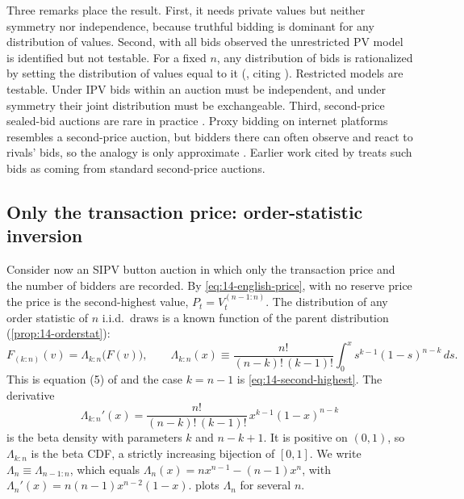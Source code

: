 Three remarks place the result. First, it needs private values but neither symmetry nor independence, because
truthful bidding is dominant for any distribution of values. Second, with all bids observed the unrestricted PV
model is identified but not testable. For a fixed $n$, any distribution of bids is rationalized by setting the
distribution of values equal to it (\citealp[p.~2118]{AtheyHaile2002}, citing \citealp{LaffontVuong1996}).
Restricted models are
testable. Under IPV bids within an auction must be independent, and under symmetry their joint distribution must be
exchangeable. Third, second-price sealed-bid auctions are rare in practice \citep[footnote~2]{AtheyHaile2007}. Proxy
bidding on internet platforms resembles a second-price auction, but bidders there can often observe and react to
rivals' bids, so the analogy is only approximate \citep[footnote~2]{AtheyHaile2007}. Earlier work cited by
\citet[footnote~2]{AtheyHaile2002} treats such bids as coming from standard second-price auctions.

\subsection{Only the transaction price: order-statistic inversion}\label{sec:15-price-only}

Consider now an SIPV button auction in which only the transaction price and the number of bidders are recorded.
By \eqref{eq:14-english-price}, with no reserve price the price is the second-highest value,
$P_t=V_t^{(n-1:n)}$. The distribution of any order statistic of $n$ i.i.d.\ draws is a known function of the parent
distribution (\cref{prop:14-orderstat}):
\begin{equation}\label{eq:15-Lambda}
F_{(k:n)}(v)=\Lambda_{k:n}\big(F(v)\big),\qquad
\Lambda_{k:n}(x)\equiv\frac{n!}{(n-k)!\,(k-1)!}\int_0^xs^{k-1}(1-s)^{n-k}\,ds .
\end{equation}
This is equation (5) of \citet{AtheyHaile2002} and the case $k=n-1$ is \eqref{eq:14-second-highest}. The derivative
\[
\Lambda_{k:n}'(x)=\frac{n!}{(n-k)!\,(k-1)!}\,x^{k-1}(1-x)^{n-k}
\]
is the beta density with parameters $k$ and $n-k+1$. It is positive on $(0,1)$, so $\Lambda_{k:n}$ is the beta
CDF, a strictly increasing bijection of $[0,1]$. We write $\Lambda_n\equiv\Lambda_{n-1:n}$, which equals
$\Lambda_n(x)=nx^{n-1}-(n-1)x^n$, with $\Lambda_n'(x)=n(n-1)x^{n-2}(1-x)$.  plots $\Lambda_n$ for
several $n$.

